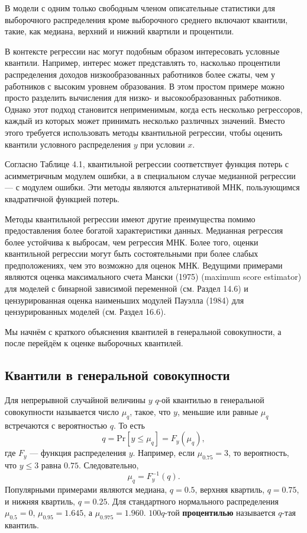 В модели с одним только свободным членом описательные статистики для выборочного распределения кроме выборочного среднего включают квантили, такие, как медиана, верхний и нижний квартили и процентили.

В контексте регрессии нас могут подобным образом интересовать условные квантили. Например, интерес может представлять то, насколько процентили распределения доходов низкообразованных работников более сжаты, чем у работников с высоким уровнем образования. В этом простом примере можно просто разделить вычисления для низко- и высокообразованных работников. Однако этот подход становится неприменимым, когда есть несколько регрессоров, каждый из которых может принимать несколько различных значений. Вместо этого требуется использовать методы квантильной регрессии, чтобы оценить квантили условного распределения $y$ при условии $x$.

Согласно Таблице 4.1, квантильной регрессии соответствует функция потерь с асимметричным модулем ошибки, а в специальном случае медианной регрессии --- с модулем ошибки. Эти методы являются альтернативой МНК, пользующимся квадратичной функцией потерь.

Методы квантильной регрессии имеют другие преимущества помимо предоставления более богатой характеристики данных. Медианная регрессия более устойчива к выбросам, чем регрессия МНК. Более того, оценки квантильной регрессии могут быть состоятельными при более слабых предположениях, чем это возможно для оценок МНК. Ведущими примерами являются оценка максимального счета Мански (1975) (maximum score estimator) для моделей с бинарной зависимой переменной (см. Раздел 14.6) и цензурированная оценка наименьших модулей Пауэлла (1984) для цензурированных моделей (см. Раздел 16.6).

Мы начнём с краткого объяснения квантилей в генеральной совокупности, а после перейдём к оценке выборочных квантилей.

\subsection{Квантили в генеральной совокупности}

Для непрерывной случайной величины $y$ $q$-ой квантилью в генеральной совокупности называется число $\mu_q$, такое, что $y$, меньшие или равные $\mu_q$ встречаются с вероятностью $q$. То есть
$$
q = \mathrm{Pr}[y \leq \mu_q] = F_y(\mu_q),
$$
где $F_y$ ---  функция распределения  $y$. Например, если $\mu_{0.75}=3$, то вероятность, что $y\leq 3$ равна $0.75$. Следовательно,
$$
\mu_q = F_y^{-1}(q).
$$
Популярными примерами являются медиана, $q=0.5$, верхняя квартиль, $q=0.75$, и нижняя квартиль, $q=0.25$. Для стандартного нормального распределения $\mu_{0.5}=0$, $\mu_{0.95}=1.645$, а $\mu_{0.975}=1.960$.  $100q$-той \textbf{процентилью} называется $q$-тая квантиль.

